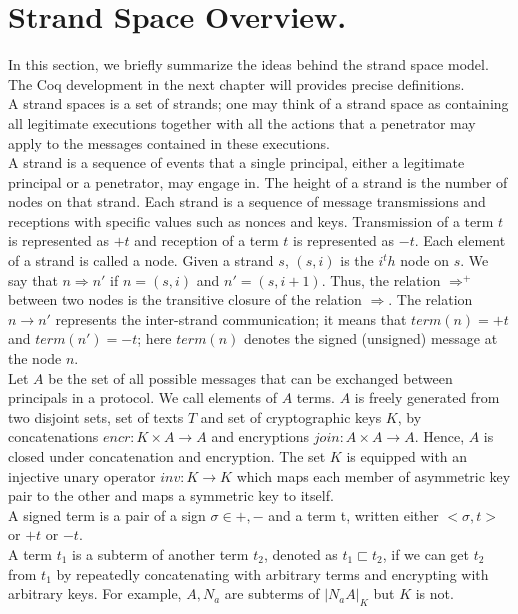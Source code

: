\section{Strand Space Overview.}
In this section, we briefly summarize the ideas behind the strand space model. The Coq development in the next chapter will provides precise definitions.\\
A strand spaces is a set of strands; one may think of a strand space as containing all legitimate executions together with all the actions that a penetrator may apply to the messages contained in these executions.\\
A strand is a sequence of events that a single principal, either a legitimate principal or a penetrator, may engage in. The height of a strand is the number of nodes on that strand. Each strand is a sequence of message transmissions and receptions with specific values such as nonces and keys. Transmission of a term $t$ is represented as $+t$ and reception of a term $t$ is represented as $-t$. Each element of a strand is called a node. Given a strand $s$, $(s,i)$ is the $i^th$ node on $s$. We say that $n \Rightarrow n'$ if $n=(s,i)$ and $n'=(s,i+1)$. Thus, the relation $\Rightarrow^+$ between two nodes is the transitive closure of the relation $\Rightarrow$. The relation $n \rightarrow n'$ represents the inter-strand communication; it means that $term(n)=+t$ and $term(n')=-t$; here $term(n)$ denotes the signed (unsigned) message at the node $n$.\\
Let $A$ be the set of all possible messages that can be exchanged between principals in a protocol. We call elements of $A$ terms. $A$ is freely generated from two disjoint sets, set of texts $T$ and set of cryptographic keys $K$, by concatenations $encr : K \times A \rightarrow A$ and encryptions $join : A \times A \rightarrow A$. Hence, $A$ is closed under concatenation and encryption. The set $K$ is equipped with an injective unary operator $inv : K \rightarrow K$ which maps each member of asymmetric key pair to the other and maps a symmetric key to itself.\\
A signed term is a pair of a sign $\sigma \in {+,-}$ and a term t, written either $<\sigma,t>$ or $+t$ or $-t$.\\
A term $t_1$ is a subterm of another term $t_2$, denoted as $t_1 \sqsubset t_2$, if we can get $t_2$ from $t_1$ by repeatedly concatenating with arbitrary terms and encrypting with arbitrary keys. For example, $A, N_a$ are subterms of ${|N_aA|}_K$ but $K$ is not.\\
